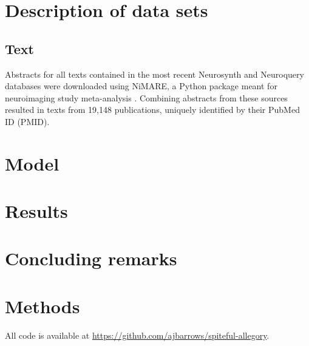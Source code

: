 \section{Description of data sets}
\label{sec:papertag.data}

\subsection{Text}

Abstracts for all texts contained in the most recent Neurosynth and Neuroquery databases were downloaded using NiMARE, a Python package meant for neuroimaging study meta-analysis \cite{SaloEtAl2022, SaloEtAl2023}. Combining abstracts from these sources resulted in texts from 19,148 publications, uniquely identified by their PubMed ID (PMID). 

\section{Model}
\label{sec:papertag.model}

\section{Results}
\label{sec:papertag.results}


\section{Concluding remarks}
\label{sec:papertag.concludingremarks}


\section{Methods}
\label{sec:papertag.methods}

All code is available at \href{https://github.com/ajbarrows/spiteful-allegory}{https://github.com/ajbarrows/spiteful-allegory}.


%
%


%

